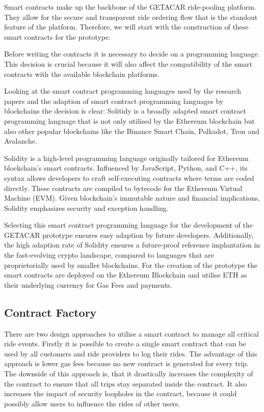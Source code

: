 Smart contracts make up the backbone of the GETACAR ride-pooling platform. They allow for the secure and transparent ride ordering flow that is the standout feature of the platform. Therefore, we will start with the construction of these smart contracts for the prototype. 

Before writing the contracts it is necessary to decide on a programming language. This decision is crucial because it will also affect the compatibility of the smart contracts with the available blockchain platforms. 

Looking at the smart contract programming languages used by the research papers and the adaption of smart contract programming languages by blockchains the decision is clear: Solitidy is a broadly adapted smart contract programming language that is not only utilised by the Ethereum blockchain but also other popular blockchains like the Binance Smart Chain, Polkadot, Tron and Avalanche. 

Solidity is a high-level programming language originally tailored for Ethereum blockchain's smart contracts. Influenced by JavaScript, Python, and C++, its syntax allows developers to craft self-executing contracts where terms are coded directly. These contracts are compiled to bytecode for the Ethereum Virtual Machine (EVM). Given blockchain's immutable nature and financial implications, Solidity emphasizes security and exception handling. 

Selecting this smart contract programming language for the development of the GETACAR prototype ensures easy adaption by future developers. Additionally, the high adaption rate of Solidity ensures a future-proof reference implantation in the fast-evolving crypto landscape, compared to languages that are proprietorially used by smaller blockchains. For the creation of the prototype the smart contracts are deployed on the Ethereum Blockchain and utilise ETH as their underlying currency for Gas Fees and payments.

\subsection{Contract Factory}
There are two design approaches to utilise a smart contract to manage all critical ride events. Firstly it is possible to create a single smart contract that can be used by all customers and ride providers to log their rides. The advantage of this approach is lower gas fees because no new contract is generated for every trip. The downside of this approach is, that it drastically increases the complexity of the contract to ensure that all trips stay separated inside the contract. It also increases the impact of security loopholes in the contract, because it could possibly allow users to influence the rides of other users. 

